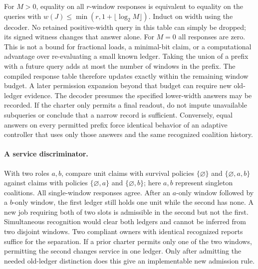 \documentclass[11pt]{article}
\begin{document}
For $M>0$, equality on all $r$-window responses is equivalent to equality on the queries with $w(J)\le\min(r,1+\lfloor\log_2 M\rfloor)$. Induct on width using the decoder. No retained positive-width query in this table can simply be dropped; its signed witness changes that answer alone. For $M=0$ all responses are zero. This is not a bound for fractional loads, a minimal-bit claim, or a computational advantage over re-evaluating a small known ledger. Taking the union of a prefix with a future query adds at most the number of windows in the prefix. The compiled response table therefore updates exactly within the remaining window budget. A later permission expansion beyond that budget can require new old-ledger evidence. The decoder presumes the specified lower-width answers may be recorded. If the charter only permits a final readout, do not impute unavailable subqueries or conclude that a narrow record is sufficient. Conversely, equal answers on every permitted prefix force identical behavior of an adaptive controller that uses only those answers and the same recognized coalition history.

\paragraph{A service discriminator.}
With two roles $a,b$, compare unit claims with survival policies $\{\varnothing\}$ and $\{\varnothing,a,b\}$ against claims with policies $\{\varnothing,a\}$ and $\{\varnothing,b\}$; here $a,b$ represent singleton coalitions. All single-window responses agree. After an $a$-only window followed by a $b$-only window, the first ledger still holds one unit while the second has none. A new job requiring both of two slots is admissible in the second but not the first. Simultaneous recognition would clear both ledgers and cannot be inferred from two disjoint windows. Two compliant owners with identical recognized reports suffice for the separation. If a prior charter permits only one of the two windows, permitting the second changes service in one ledger. Only after admitting the needed old-ledger distinction does this give an implementable new admission rule.
\end{document}
